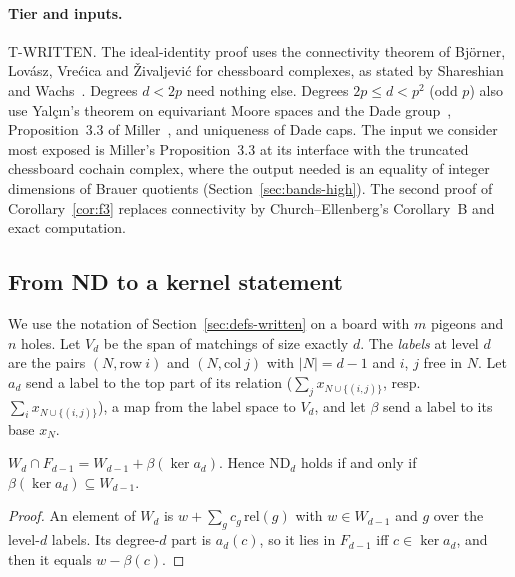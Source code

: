 \paragraph{Tier and inputs.}  T-WRITTEN.  The ideal-identity proof uses the connectivity
theorem of Bj\"orner, Lov\'asz, Vre\'cica and \v Zivaljevi\'c for chessboard complexes, as stated by
Shareshian and Wachs~\cite[Thm.~1.1]{shareshianwachs}.  Degrees $d<2p$ need nothing else.
Degrees $2p\le d<p^2$ (odd $p$) also use Yal\c c\i n's theorem on equivariant Moore spaces and
the Dade group~\cite[Def.~1.1, Props.~3.8, 5.7]{yalcin2016}, Proposition~3.3 of
Miller~\cite{miller2024}, and uniqueness of Dade caps.  The input we consider most exposed is
Miller's Proposition~3.3 at its interface with the truncated chessboard cochain complex,
where the output needed is an equality of integer dimensions of Brauer quotients
(Section~\ref{sec:bands-high}).  The second proof of Corollary~\ref{cor:f3} replaces
connectivity by Church--Ellenberg's Corollary~B and exact computation.

\subsection{From ND to a kernel statement}\label{sec:bands-reduction}

We use the notation of Section~\ref{sec:defs-written} on a board with $m$ pigeons and $n$
holes.  Let $V_d$ be the span of matchings of size exactly $d$.  The \emph{labels} at level
$d$ are the pairs $(N,\mathrm{row}\ i)$ and $(N,\mathrm{col}\ j)$ with $|N|=d-1$ and $i$, $j$
free in $N$.  Let $a_d$ send a label to the top part of its relation
($\sum_jx_{N\cup\{(i,j)\}}$, resp.\ $\sum_ix_{N\cup\{(i,j)\}}$), a map from the label space
to $V_d$, and let $\beta$ send a label to its base $x_N$.

\begin{lemma}\label{lem:nd-ker}
$W_d\cap F_{d-1}=W_{d-1}+\beta(\ker a_d)$.  Hence $\mathrm{ND}_d$ holds if and only if
$\beta(\ker a_d)\subseteq W_{d-1}$.
\end{lemma}

\begin{proof}
An element of $W_d$ is $w+\sum_gc_g\,\mathrm{rel}(g)$ with $w\in W_{d-1}$ and $g$ over the
level-$d$ labels.  Its degree-$d$ part is $a_d(c)$, so it lies in $F_{d-1}$ iff
$c\in\ker a_d$, and then it equals $w-\beta(c)$.
\end{proof}

